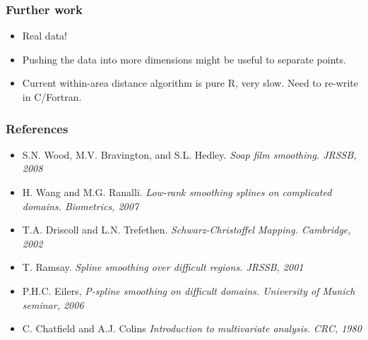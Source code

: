 \documentclass[ignorenonframetext]{beamer} %
\newcommand{\bi}{\begin{itemize}}
\newcommand{\ei}{\end{itemize}}
\begin{document}
\begin{frame}
	\frametitle{Further work}
       \bi
         \item Real data!
         \item Pushing the data into more dimensions might be useful to separate points. 
         \item Current within-area distance algorithm is pure R, very slow. Need to re-write in C/Fortran.
          
        \ei
\end{frame}




\begin{frame}
	\frametitle{References}
       \bi
         \item S.N. Wood, M.V. Bravington, and S.L. Hedley. \emph{Soap film smoothing. JRSSB, 2008}
         \item H. Wang and M.G. Ranalli. \emph{Low-rank smoothing splines on complicated domains. Biometrics, 2007}
         \item T.A. Driscoll and L.N. Trefethen. \emph{Schwarz-Christoffel Mapping. Cambridge, 2002}
         \item T. Ramsay. \emph{Spline smoothing over difficult regions. JRSSB, 2001}
         \item P.H.C. Eilers, \emph{P-spline smoothing on difficult domains. University of Munich seminar, 2006}
	\item C. Chatfield and A.J. Colins \emph{Introduction to multivariate analysis. CRC, 1980}
        \ei
\end{frame}
\end{document}
